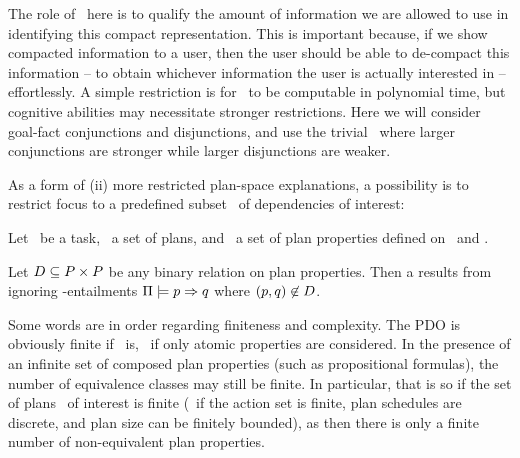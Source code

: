 The role of \entailsuff\ here is to qualify the amount of information
we are allowed to use in identifying this compact representation. This
is important because, if we show compacted information to a user, then
the user should be able to de-compact this information -- to obtain
whichever information the user is actually interested in --
effortlessly. A simple restriction is for \entailsuff\ to be
computable in polynomial time, but cognitive abilities may necessitate
stronger restrictions. Here we will consider goal-fact conjunctions
and disjunctions, and use the trivial \entailsuff\ where larger
conjunctions are stronger while larger disjunctions are weaker.

%
%

As a form of (ii) more restricted plan-space explanations, a
possibility is to restrict focus to a predefined subset \deps\ of
dependencies of interest:

\begin{definition}
Let \task\ be a task, \plans\ a set of plans, and \props\ a set of
plan properties defined on \task\ and \plans.

Let $D \subseteq P \times P$ be any binary relation on
plan properties. Then a  results from
ignoring \plans-entailments $\Pi \models p \Rightarrow q$ where
$(p,q) \not\in D$.
\end{definition}

Some words are in order regarding finiteness and complexity. The PDO
is obviously finite if \props\ is, \eg\ if only atomic properties are
considered. In the presence of an infinite set of composed plan
properties (such as propositional formulas), the number of equivalence
classes may still be finite. In particular, that is so if the set of
plans \plans\ of interest is finite (\eg\ if the action set is finite,
plan schedules are discrete, and plan size can be finitely bounded),
as then there is only a finite number of non-equivalent plan
properties.
%
%

